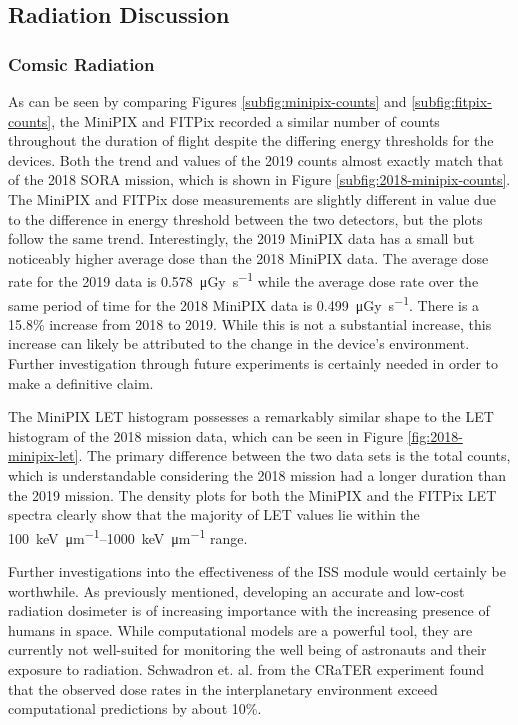 \subsection{Radiation Discussion}
\label{sec:Radiation-Discussion}

\subsubsection{Comsic Radiation}
As can be seen by comparing Figures \ref{subfig:minipix-counts} and \ref{subfig:fitpix-counts}, the MiniPIX and FITPix recorded a similar number of counts throughout the duration of flight despite the differing energy thresholds for the devices.
Both the trend and values of the 2019 counts almost exactly match that of the 2018 SORA mission, which is shown in Figure \ref{subfig:2018-minipix-counts}.
The MiniPIX and FITPix dose measurements are slightly different in value due to the difference in energy threshold between the two detectors, but the plots follow the same trend.
Interestingly, the 2019 MiniPIX data has a small but noticeably higher average dose than the 2018 MiniPIX data.
The average dose rate for the 2019 data is \SI{0.578}{\micro\gray\per\second} while the average dose rate over the same period of time for the 2018 MiniPIX data is \SI{0.499}{\micro\gray\per\second}.
There is a 15.8\% increase from 2018 to 2019.
While this is not a substantial increase, this increase can likely be attributed to the change in the device's environment.
Further investigation through future experiments is certainly needed in order to make a definitive claim.

The MiniPIX LET histogram possesses a remarkably similar shape to the LET histogram of the 2018 mission data, which can be seen in Figure \ref{fig:2018-minipix-let}.
The primary difference between the two data sets is the total counts, which is understandable considering the 2018 mission had a longer duration than the 2019 mission.
The density plots for both the MiniPIX and the FITPix LET spectra clearly show that the majority of LET values lie within the \SIrange{100}{1000}{\kilo\eV\per\micro\meter} range.

Further investigations into the effectiveness of the ISS module would certainly be worthwhile.
As previously mentioned, developing an accurate and low-cost radiation dosimeter is of increasing importance with the increasing presence of humans in space.
While computational models are a powerful tool, they are currently not well-suited for monitoring the well being of astronauts and their exposure to radiation.
Schwadron et. al. \cite{Schwadron-Update} from the CRaTER experiment found that the observed dose rates in the interplanetary environment exceed computational predictions by about 10\%.

